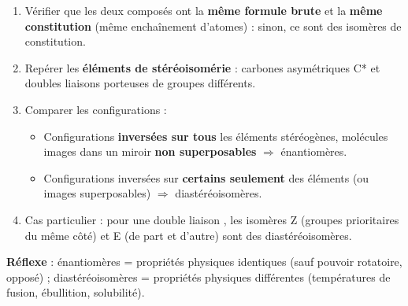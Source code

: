 \documentclass[11pt]{article}
\newcommand{\cle}[1]{{\popxbold\color{popdark}#1}}
\begin{document}
\begin{methode}
\begin{enumerate}
\item Vérifier que les deux composés ont la \textbf{même formule brute} et la \textbf{même constitution} (même enchaînement d'atomes) : sinon, ce sont des isomères de constitution.
\item Repérer les \textbf{éléments de stéréoisomérie} : carbones asymétriques C* et doubles liaisons  porteuses de groupes différents.
\item Comparer les configurations :
\begin{itemize}
\item Configurations \textbf{inversées sur tous} les éléments stéréogènes, molécules images dans un miroir \textbf{non superposables} $\Rightarrow$ \cle{énantiomères}.
\item Configurations inversées sur \textbf{certains seulement} des éléments (ou images superposables) $\Rightarrow$ \cle{diastéréoisomères}.
\end{itemize}
\item Cas particulier : pour une double liaison , les isomères \cle{Z} (groupes prioritaires du même côté) et \cle{E} (de part et d'autre) sont des diastéréoisomères.
\end{enumerate}
\textbf{Réflexe} : énantiomères = propriétés physiques identiques (sauf pouvoir rotatoire, opposé) ; diastéréoisomères = propriétés physiques différentes (températures de fusion, ébullition, solubilité).
\end{methode}
\end{document}
